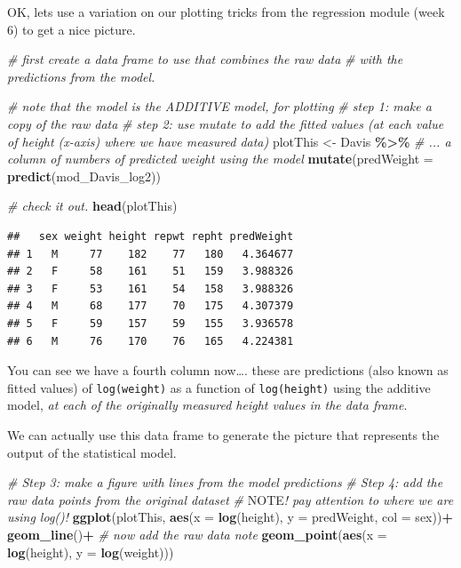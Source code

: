 \documentclass[
]{book}
\newenvironment{Shaded}{\begin{snugshade}}{\end{snugshade}}
\newcommand{\AlertTok}[1]{\textcolor[rgb]{0.94,0.16,0.16}{#1}}
\newcommand{\AttributeTok}[1]{\textcolor[rgb]{0.13,0.29,0.53}{#1}}
\newcommand{\CommentTok}[1]{\textcolor[rgb]{0.56,0.35,0.01}{\textit{#1}}}
\newcommand{\FunctionTok}[1]{\textcolor[rgb]{0.13,0.29,0.53}{\textbf{#1}}}
\newcommand{\NormalTok}[1]{#1}
\newcommand{\OtherTok}[1]{\textcolor[rgb]{0.56,0.35,0.01}{#1}}
\newcommand{\SpecialCharTok}[1]{\textcolor[rgb]{0.81,0.36,0.00}{\textbf{#1}}}
\begin{document}
OK, lets use a variation on our plotting tricks from the regression module (week 6) to get a nice picture.

\begin{Shaded}
\begin{Highlighting}[]
\CommentTok{\# first create a data frame to use that combines the raw data}
\CommentTok{\# with the predictions from the model.}

\CommentTok{\# note that the model is the ADDITIVE model, for plotting}
\CommentTok{\# step 1: make a copy of the raw data}
\CommentTok{\# step 2: use mutate to add the fitted values (at each value of height (x{-}axis) where we have measured data)}
\NormalTok{plotThis }\OtherTok{\textless{}{-}}\NormalTok{ Davis }\SpecialCharTok{\%\textgreater{}\%}
  \CommentTok{\# ... a column of numbers of predicted weight using the model}
  \FunctionTok{mutate}\NormalTok{(}\AttributeTok{predWeight =} \FunctionTok{predict}\NormalTok{(mod\_Davis\_log2))}

\CommentTok{\# check it out.}
\FunctionTok{head}\NormalTok{(plotThis)}
\end{Highlighting}
\end{Shaded}

\begin{verbatim}
##   sex weight height repwt repht predWeight
## 1   M     77    182    77   180   4.364677
## 2   F     58    161    51   159   3.988326
## 3   F     53    161    54   158   3.988326
## 4   M     68    177    70   175   4.307379
## 5   F     59    157    59   155   3.936578
## 6   M     76    170    76   165   4.224381
\end{verbatim}

You can see we have a fourth column now\ldots. these are predictions (also known as fitted values) of \texttt{log(weight)} as a function of \texttt{log(height)} using the additive model, \emph{at each of the originally measured height values in the data frame}.

We can actually use this data frame to generate the picture that represents the output of the statistical model.

\begin{Shaded}
\begin{Highlighting}[]
\CommentTok{\# Step 3: make a figure with lines from the model predictions}
\CommentTok{\# Step 4: add the raw data points from the original dataset}
\CommentTok{\# }\AlertTok{NOTE}\CommentTok{! pay attention to where we are using log()!}
\FunctionTok{ggplot}\NormalTok{(plotThis, }\FunctionTok{aes}\NormalTok{(}\AttributeTok{x =} \FunctionTok{log}\NormalTok{(height), }\AttributeTok{y =}\NormalTok{ predWeight, }\AttributeTok{col =}\NormalTok{ sex))}\SpecialCharTok{+}
  \FunctionTok{geom\_line}\NormalTok{()}\SpecialCharTok{+}
  \CommentTok{\# now add the raw data note}
  \FunctionTok{geom\_point}\NormalTok{(}\FunctionTok{aes}\NormalTok{(}\AttributeTok{x =} \FunctionTok{log}\NormalTok{(height), }\AttributeTok{y =} \FunctionTok{log}\NormalTok{(weight)))}
\end{Highlighting}
\end{Shaded}
\end{document}
